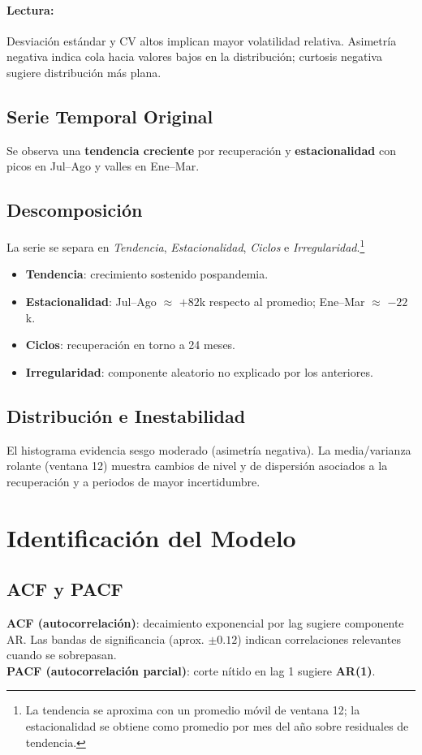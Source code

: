 \documentclass[11pt,a4paper]{article}
\begin{document}
\paragraph{Lectura:} Desviación estándar y CV altos implican mayor volatilidad relativa. Asimetría negativa indica cola hacia valores bajos en la distribución; curtosis negativa sugiere distribución más plana.

\subsection{Serie Temporal Original}
Se observa una \textbf{tendencia creciente} por recuperación y \textbf{estacionalidad} con picos en Jul--Ago y valles en Ene--Mar.

\subsection{Descomposición}
La serie se separa en \textit{Tendencia}, \textit{Estacionalidad}, \textit{Ciclos} e \textit{Irregularidad}.\footnote{La tendencia se aproxima con un promedio móvil de ventana 12; la estacionalidad se obtiene como promedio por mes del año sobre residuales de tendencia.}
\begin{itemize}
  \item \textbf{Tendencia}: crecimiento sostenido pospandemia.
  \item \textbf{Estacionalidad}: Jul--Ago $\approx$ $+82$k respecto al promedio; Ene--Mar $\approx$ $-22$k.
  \item \textbf{Ciclos}: recuperación en torno a 24 meses.
  \item \textbf{Irregularidad}: componente aleatorio no explicado por los anteriores.
\end{itemize}

\subsection{Distribución e Inestabilidad}
El histograma evidencia sesgo moderado (asimetría negativa). La media/varianza rolante (ventana 12) muestra cambios de nivel y de dispersión asociados a la recuperación y a periodos de mayor incertidumbre.

\section{Identificación del Modelo}
\subsection{ACF y PACF}
\textbf{ACF (autocorrelación)}: decaimiento exponencial por lag sugiere componente AR. Las bandas de significancia (aprox. $\pm0.12$) indican correlaciones relevantes cuando se sobrepasan.\\
\textbf{PACF (autocorrelación parcial)}: corte nítido en lag 1 sugiere \textbf{AR(1)}.
\end{document}
